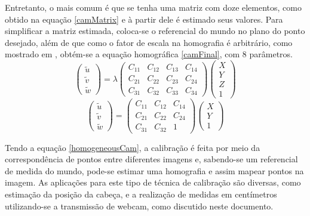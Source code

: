 \documentclass{bmvc2k}
\begin{document}
Entretanto, o mais comum é que se tenha uma matriz com doze elementos, como obtido na equação \ref{camMatrix} e à partir dele é estimado seus valores. Para simplificar a matriz estimada, coloca-se o referencial do mundo no plano do ponto desejado, além de que como o fator de escala na homografia é arbitrário, como mostrado em \cite{Opencv02}, obtém-se a equação homográfica \ref{camFinal}, com 8 parâmetros.
\begin{equation}\label{camMatrix}
    \left( \begin{array}{c}{\tilde{u}} \\ {\tilde{v}} \\ {\tilde{w}}\end{array}\right)=\lambda \left( \begin{array}{cccc}{C_{11}} & {C_{12}} & {C_{13}} & {C_{14}} \\ {C_{21}} & {C_{22}} & {C_{23}} & {C_{24}} \\ {C_{31}} & {C_{32}} & {C_{33}} & {C_{34}}\end{array}\right) \left( \begin{array}{l}{X} \\ {Y} \\ {Z} \\ {1}\end{array}\right)
\end{equation}
\begin{equation}\label{camFinal}
    \left( \begin{array}{c}{\tilde{u}} \\ {\tilde{v}} \\ {\tilde{w}}\end{array}\right)=\left( \begin{array}{lll}{C_{11}} & {C_{12}} & {C_{14}} \\ {C_{21}} & {C_{22}} & {C_{24}} \\ {C_{31}} & {C_{32}} & {1}\end{array}\right) \left( \begin{array}{l}{X} \\ {Y} \\ {1}\end{array}\right)
\end{equation}

Tendo a equação \ref{homogeneousCam}, a calibração é feita por meio da correspondência de pontos entre diferentes imagens e, sabendo-se um referencial de medida do mundo, pode-se estimar uma homografia e assim mapear pontos na imagem. As aplicações para este tipo de técnica de calibração são diversas, como estimação da posição da cabeça\cite{Opencv100}, e a realização de medidas em centímetros utilizando-se a transmissão de webcam, como discutido neste documento.\\
\end{document}
